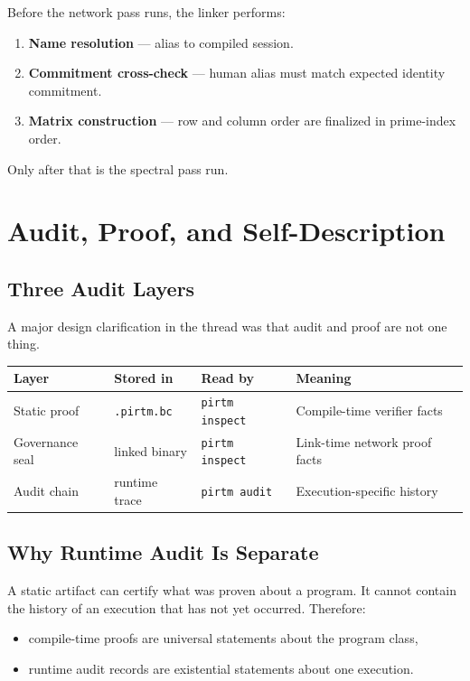\documentclass[11pt]{article}
\begin{document}
Before the network pass runs, the linker performs:

\begin{enumerate}[leftmargin=2em]
  \item \textbf{Name resolution} --- alias to compiled session.
  \item \textbf{Commitment cross-check} --- human alias must match expected identity commitment.
  \item \textbf{Matrix construction} --- row and column order are finalized in prime-index order.
\end{enumerate}

Only after that is the spectral pass run.

\section{Audit, Proof, and Self-Description}

\subsection{Three Audit Layers}

A major design clarification in the thread was that audit and proof are not one thing.

\begin{center}
\begin{tabular}{llll}
\toprule
Layer & Stored in & Read by & Meaning \\
\midrule
Static proof & \texttt{.pirtm.bc} & \texttt{pirtm inspect} & Compile-time verifier facts \\
Governance seal & linked binary & \texttt{pirtm inspect} & Link-time network proof facts \\
Audit chain & runtime trace & \texttt{pirtm audit} & Execution-specific history \\
\bottomrule
\end{tabular}
\end{center}

\subsection{Why Runtime Audit Is Separate}

A static artifact can certify what was proven about a program. It cannot contain the history of an execution that has not yet occurred. Therefore:
\begin{itemize}[leftmargin=2em]
  \item compile-time proofs are universal statements about the program class,
  \item runtime audit records are existential statements about one execution.
\end{itemize}
\end{document}
